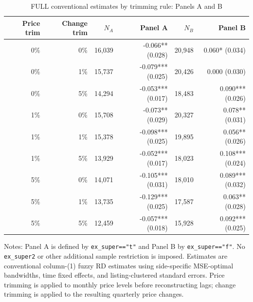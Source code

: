 \documentclass[11pt]{article}
\begin{document}
\begin{table}[!htbp]
\centering
\caption{FULL conventional estimates by trimming rule: Panels A and B}
\label{tab:panels_ab_trim_grid_full}
\small
\begin{tabular}{rrrrrr}
\toprule
Price trim & Change trim & $N_A$ & Panel A & $N_B$ & Panel B \\
\midrule
0\% & 0\% & 16,039 & -0.066** (0.028) & 20,948 & 0.060* (0.034) \\
0\% & 1\% & 15,737 & -0.079*** (0.025) & 20,426 & 0.000 (0.030) \\
0\% & 5\% & 14,294 & -0.053*** (0.017) & 18,483 & 0.090*** (0.026) \\
1\% & 0\% & 15,708 & -0.073** (0.029) & 20,327 & 0.078** (0.031) \\
1\% & 1\% & 15,378 & -0.098*** (0.025) & 19,895 & 0.056** (0.026) \\
1\% & 5\% & 13,929 & -0.052*** (0.017) & 18,023 & 0.108*** (0.024) \\
5\% & 0\% & 14,071 & -0.105*** (0.031) & 18,010 & 0.089*** (0.032) \\
5\% & 1\% & 13,735 & -0.129*** (0.025) & 17,587 & 0.063** (0.028) \\
5\% & 5\% & 12,459 & -0.057*** (0.018) & 15,928 & 0.092*** (0.025) \\
\bottomrule
\end{tabular}
\begin{minipage}{0.95\textwidth}\footnotesize
Notes: Panel A is defined by \texttt{ex\_super=="t"} and Panel B by \texttt{ex\_super=="f"}. No \texttt{ex\_super2} or other additional sample restriction is imposed. Estimates are conventional column-(1) fuzzy RD estimates using side-specific MSE-optimal bandwidths, time fixed effects, and listing-clustered standard errors. Price trimming is applied to monthly price levels before reconstructing lags; change trimming is applied to the resulting quarterly price changes.
\end{minipage}
\end{table}
\end{document}
